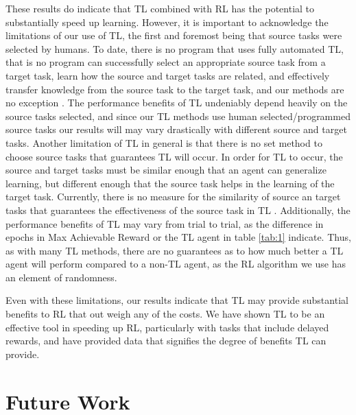 \documentclass{llncs}
\begin{document}
These results do indicate that TL combined with RL has the potential to substantially speed up learning. 
However, it is important to acknowledge the limitations of our use of TL, the first and foremost being that source tasks were selected by humans. 
To date, there is no program that uses fully automated TL, that is no program can successfully select an appropriate source task from a target task, learn how the source and target tasks are related, and effectively transfer knowledge from the source task to the target task, and our methods are no exception \citep{taylor2009transfer}. 
The performance benefits of TL undeniably depend heavily on the source tasks selected, and since our TL methods use human selected/programmed source tasks our results will may vary drastically with different source and target tasks. 
Another limitation of TL in general is that there is no set method to choose source tasks that guarantees TL will occur.
In order for TL to occur, the source and target tasks must be similar enough that an agent can generalize learning, but different enough that the source task helps in the learning of the target task.
Currently, there is no measure for the similarity of source an target tasks that guarantees the effectiveness of the source task in TL \citep{taylor2009transfer}.
Additionally, the performance benefits of TL may vary from trial to trial, as the difference in epochs in Max Achievable Reward or the TL agent in table \ref{tab:1} indicate. 
Thus, as with many TL methods, there are no guarantees as to how much better a TL agent will perform compared to a non-TL agent, as the RL algorithm we use has an element of randomness. 

Even with these limitations, our results indicate that TL may provide substantial benefits to RL that out weigh any of the costs.
We have shown TL to be an effective tool in speeding up RL, particularly with tasks that include delayed rewards, and have provided data that signifies the degree of benefits TL can provide.



\section{Future Work}
\end{document}
